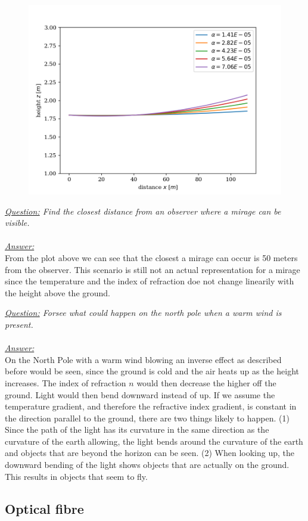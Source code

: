 \documentclass{article}
\begin{document}
\begin{figure}[h!]
	\centering
	\includegraphics[width=0.5\linewidth,keepaspectratio]{afbeeldingen/light path.png}
	\label{fig:paths}
\end{figure}
\textit{\underline{Question:} Find the closest distance from an observer where a mirage can be visible.}\\
\\
\textit{\underline{Answer:}} \\
From the plot above we can see that the closest a mirage can occur is 50 meters from the observer. This scenario is still not an actual representation for a mirage since the temperature and the index of refraction doe not change linearily with the height above the ground.

\textit{\underline{Question:} Forsee what could happen on the north pole when a warm wind is present.}\\
\\
\textit{\underline{Answer:}} \\
On the North Pole with a warm wind blowing an inverse effect as described before would be seen, since the ground is cold and the air heats up as the height increases. The index of refraction $n$ would then decrease the higher off the ground. Light would then bend downward instead of up. If we assume the temperature gradient, and therefore the refractive index gradient, is constant in the direction parallel to the ground, there are two things likely to happen. (1) Since the path of the light has its curvature in the same direction as the curvature of the earth allowing, the light bends around the curvature of the earth and objects that are beyond the horizon can be seen. (2) When looking up, the downward bending of the light shows objects that are actually on the ground. This results in objects that seem to fly.\\

\subsection{Optical fibre}
\end{document}
